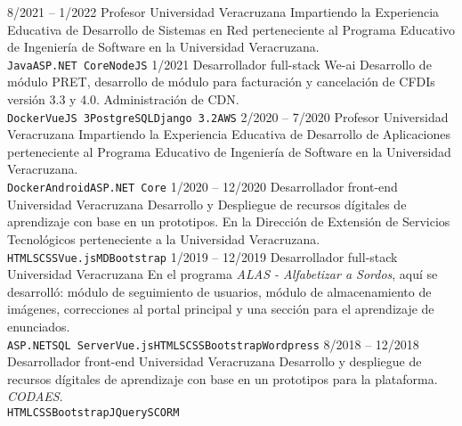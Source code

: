 \documentclass[9pt]{developercv} %
\begin{document}
\begin{entrylist}
	\entry
		{8/2021 -- 1/2022}
		{Profesor}
		{Universidad Veracruzana}
        {Impartiendo la Experiencia Educativa de Desarrollo de Sistemas en Red perteneciente al Programa Educativo de Ingeniería de Software en la Universidad Veracruzana.\\
        \texttt{Java}\slashsep\texttt{ASP.NET Core}\slashsep\texttt{NodeJS}}
	\entry
		{1/2021}
		{Desarrollador full-stack}
		{We-ai}
		{Desarrollo de módulo PRET, desarrollo de módulo para facturación y cancelación de CFDIs versión 3.3 y 4.0. Administración de CDN.\\
		\texttt{Docker}\slashsep\texttt{VueJS 3}\slashsep\texttt{PostgreSQL}\slashsep\texttt{Django 3.2}\slashsep\texttt{AWS}}
    \entry
		{2/2020 -- 7/2020}
		{Profesor}
		{Universidad Veracruzana}
        {Impartiendo la Experiencia Educativa de Desarrollo de Aplicaciones perteneciente al Programa Educativo de Ingeniería de Software en la Universidad Veracruzana.\\
        \texttt{Docker}\slashsep\texttt{Android}\slashsep\texttt{ASP.NET Core}}
	\entry
		{1/2020 -- 12/2020}
		{Desarrollador front-end}
		{Universidad Veracruzana}
        {Desarrollo y Despliegue de recursos dígitales de aprendizaje con base en un prototipos. En la Dirección de Extensión de Servicios Tecnológicos perteneciente a la Universidad Veracruzana.
        \texttt{HTML}\slashsep\texttt{SCSS}\slashsep\texttt{Vue.js}\slashsep\texttt{MDBootstrap}}
	\entry
		{1/2019 -- 12/2019}
		{Desarrollador full-stack}
		{Universidad Veracruzana}
        {En el programa \textit{ALAS - Alfabetizar a Sordos}, aquí se desarrolló: módulo de seguimiento de usuarios, módulo de almacenamiento de imágenes, correcciones al portal principal y una sección para el aprendizaje de enunciados. \\
        \texttt{ASP.NET}\slashsep\texttt{SQL Server}\slashsep\texttt{Vue.js}\slashsep\texttt{HTML}\slashsep\texttt{SCSS}\slashsep\texttt{Bootstrap}\slashsep\texttt{Wordpress}}
	\entry
		{8/2018 -- 12/2018}
		{Desarrollador front-end}
		{Universidad Veracruzana}
        {Desarrollo y despliegue de recursos dígitales de aprendizaje con base en un prototipos para la plataforma. \textit{CODAES}. \\
        \texttt{HTML}\slashsep\texttt{CSS}\slashsep\texttt{Bootstrap}\slashsep\texttt{JQuery}\slashsep\texttt{SCORM}}
\end{entrylist}

\end{document}
